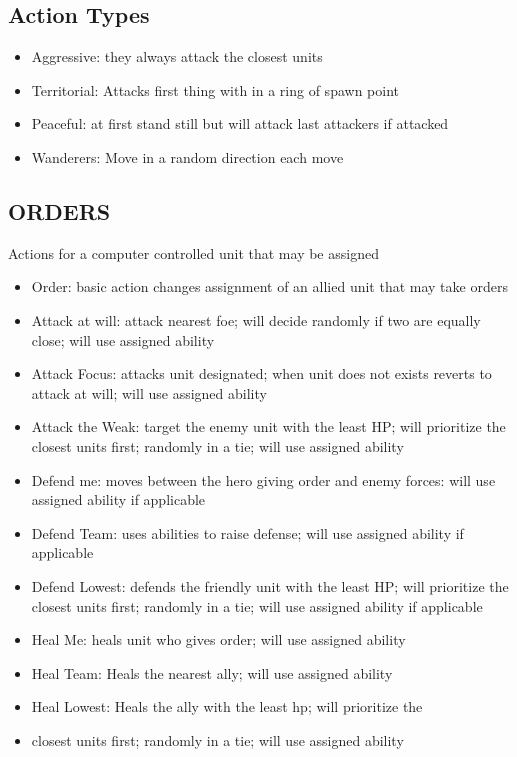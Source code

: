 \subsection{Action Types}
\begin{itemize}
\item Aggressive: they always attack the closest units
\item Territorial: Attacks first thing with in a ring of spawn point
\item Peaceful: at first stand still but will attack last attackers if attacked
\item Wanderers: Move in a random direction each move
\end{itemize}
\subsection{ORDERS}
Actions for a computer controlled unit that may be assigned
\begin{itemize}
\item Order: basic action changes assignment of an allied unit that may take orders
\item Attack at will: attack nearest foe; will decide randomly if two are equally close; will use assigned ability
\item Attack Focus: attacks unit designated; when unit does not exists reverts to attack at will; will use assigned ability
\item Attack the Weak: target the enemy unit with the least HP; will prioritize the closest units first; randomly in a tie; will use assigned ability
\item Defend me: moves between the hero giving order and enemy forces: will use assigned ability if applicable
\item Defend Team: uses abilities to raise defense; will use assigned ability if applicable
\item Defend Lowest:  defends the friendly unit with the least HP; will prioritize the closest units first; randomly in a tie; will use assigned ability if applicable
\item Heal Me: heals unit who gives order; will use assigned ability 
\item Heal Team: Heals the nearest ally; will use assigned ability
\item Heal Lowest: Heals the ally with the least hp; will prioritize the \item closest units first; randomly in a tie; will use assigned ability
\end{itemize}
